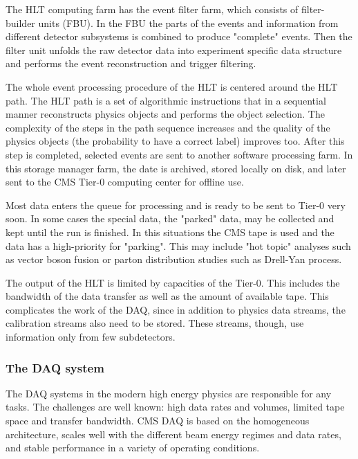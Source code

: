\begin{normalsize}
The HLT computing farm has the event filter farm, which consists of filter-builder units (FBU). In the FBU the parts of the events and information from different detector subsystems is combined to produce "complete" events. Then the filter unit unfolds the raw detector data into experiment specific data structure and performs the event reconstruction and trigger filtering. 


The whole event processing procedure of the HLT is centered around the HLT path. The HLT path is a set of algorithmic instructions that in a sequential manner reconstructs physics objects and performs the object selection. The complexity of the steps in the path sequence increases and the quality of the physics objects (the probability to have a correct label) improves too. After this step is completed, selected events are sent to another software processing farm. In this storage manager farm, the date is archived, stored locally on disk, and later sent to the CMS Tier-0 computing center for offline use. 

Most data enters the queue for processing and is ready to be sent to Tier-0 very soon. In some cases the special data, the "parked" data, may be collected and kept until the run is finished. In this situations the CMS tape is used and the data has a high-priority for "parking". This may include "hot topic" analyses such as vector boson fusion or parton distribution studies such as Drell-Yan process.

The output of the HLT is limited by capacities of the Tier-0. This includes the bandwidth of the data transfer as well as the amount of available tape. This complicates the work of the DAQ, since in addition to physics data streams, the calibration streams also need to be stored. These streams, though, use information only from few subdetectors. 



\subsubsection{The DAQ system}



The DAQ systems in the modern high energy physics are responsible for any tasks. The challenges are well known: high data rates and volumes, limited tape space and transfer bandwidth. CMS DAQ is based on the homogeneous architecture, scales well with the different beam energy regimes and data rates, and stable  performance  in  a  variety  of  operating  conditions.  


\end{normalsize}
